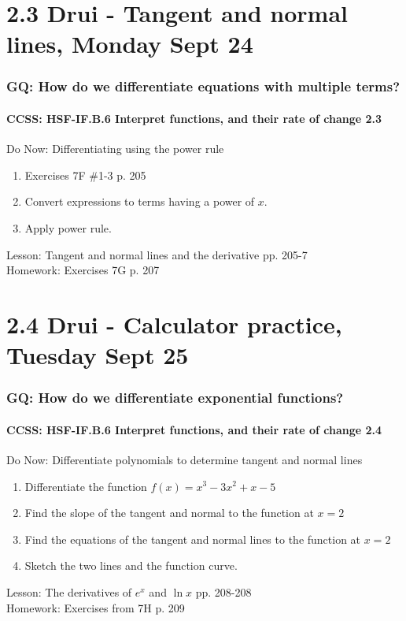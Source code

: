 \documentclass{beamer}
\begin{document}
  \section{2.3 Drui - Tangent and normal lines, Monday Sept 24}
    \frame
    {
      \frametitle{GQ: How do we differentiate equations with multiple terms?}
      \framesubtitle{CCSS: HSF-IF.B.6 Interpret functions, and their rate of change  \alert{2.3}}

      \begin{block}{Do Now: Differentiating using the power rule}
        \begin{enumerate}
        \item Exercises 7F \#1-3 p. 205
        \item Convert expressions to terms having a power of $x$.
        \item Apply power rule.
        \end{enumerate}
     \end{block}
      Lesson: Tangent and normal lines and the derivative pp. 205-7\\ \bigskip
      Homework: Exercises 7G p. 207
    }

\section{2.4 Drui - Calculator practice, Tuesday Sept 25}
  \frame
  {
    \frametitle{GQ: How do we differentiate exponential functions?}
    \framesubtitle{CCSS: HSF-IF.B.6 Interpret functions, and their rate of change  \alert{2.4}}

    \begin{block}{Do Now: Differentiate polynomials to determine tangent and normal lines}
      \begin{enumerate}
      \item Differentiate the function $f(x)=x^3-3x^2+x-5$
      \item Find the slope of the tangent and normal to the function at $x=2$
      \item Find the equations of the tangent and normal lines to the function at $x=2$
      \item Sketch the two lines and the function curve.
      \end{enumerate}
   \end{block}
    Lesson: The derivatives of $e^x$ and $\ln x$ pp. 208-208\\ \bigskip
    Homework: Exercises from 7H p. 209
  }
\end{document}
